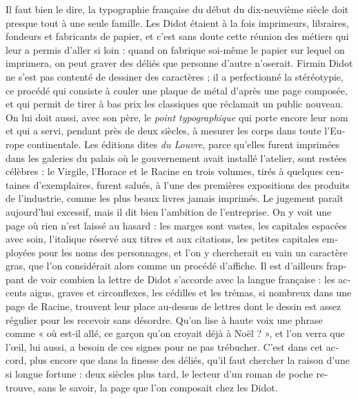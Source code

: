 \documentclass[10.5pt]{article}
\newcommand\smc[1]{{\addfontfeature{Letters=SmallCaps}#1}}
\begin{document}
\begin{otherlanguage}{french}
\smc{Il faut bien le dire}, la typographie française du début du
dix-neuvième siècle doit presque tout à une seule famille. Les Didot étaient à
la fois imprimeurs, libraires, fondeurs et fabricants de papier, et c’est sans
doute cette réunion des métiers qui leur a permis d’aller si loin : quand on
fabrique soi-même le papier sur lequel on imprimera, on peut graver des
déliés que personne d’autre n’oserait. Firmin Didot ne s’est pas contenté de
dessiner des caractères ; il a perfectionné la stéréotypie, ce procédé qui
consiste à couler une plaque de métal d’après une page composée, et qui permit
de tirer à bas prix les classiques que réclamait un public nouveau. On lui doit
aussi, avec son père, le \emph{point typographique} qui porte encore leur nom
et qui a servi, pendant près de deux siècles, à mesurer les corps dans toute
l’Europe continentale. Les éditions dites \emph{du Louvre}, parce qu’elles
furent imprimées dans les galeries du palais où le gouvernement avait installé
l’atelier, sont restées célèbres : le Virgile, l’Horace et le Racine en trois
volumes, tirés à quelques centaines d’exemplaires, furent salués, à
l’une des premières expositions des produits de l’industrie, comme les plus
beaux livres jamais imprimés. Le
jugement paraît aujourd’hui excessif, mais il dit bien l’ambition de
l’entreprise. On y voit une page où rien n’est laissé au hasard : les marges
sont vastes, les capitales espacées avec soin, l’italique réservé aux titres
et aux citations, les petites capitales employées pour les noms des
personnages, et l’on y chercherait en vain un caractère gras, que l’on
considérait alors comme un procédé d’affiche. Il est d’ailleurs frappant de
voir combien la lettre de Didot s’accorde avec la langue française : les
accents aigus, graves et circonflexes, les cédilles et les trémas, si nombreux
dans une page de Racine, trouvent leur place au-dessus de lettres dont le
dessin est assez régulier pour les recevoir sans désordre. Qu’on lise à haute
voix une phrase comme « où est-il allé, ce garçon qu’on croyait déjà à
Noël ? », et l’on verra que l’œil, lui aussi, a besoin de ces signes pour ne
pas trébucher. C’est dans cet accord, plus encore que dans la finesse des
déliés, qu’il faut chercher la raison d’une si longue fortune : deux siècles plus
tard, le lecteur d’un roman de poche retrouve, sans le savoir, la page que
l’on composait chez les Didot.
\end{otherlanguage}
\newpage
\end{document}
